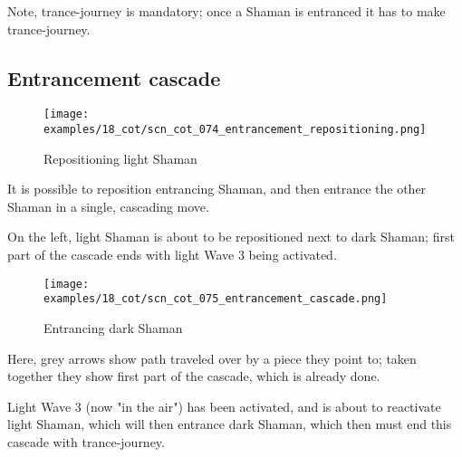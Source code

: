 Note, trance-journey is mandatory; once a Shaman is entranced it has to make
trance-journey.

\clearpage %

\subsection*{Entrancement cascade}
\label{sec:Conquest of Tlalocan/Trance-journey/Entrancement cascade}

\noindent
\begin{wrapfigure}[9]{l}{0.4\textwidth}
\centering
\texttt{[image: examples/18\_cot/scn\_cot\_074\_entrancement\_repositioning.png]}
\vspace*{-0.4\baselineskip}
\caption{Repositioning light Shaman}
\label{fig:scn_cot_074_entrancement_repositioning}
\end{wrapfigure}
It is possible to reposition entrancing Shaman, and then entrance the other Shaman
in a single, cascading move.

On the left, light Shaman is about to be repositioned next to dark Shaman; first
part of the cascade ends with light Wave 3 being activated.

\vspace*{5.3\baselineskip}

\noindent
\begin{wrapfigure}[11]{l}{0.4\textwidth}
\centering
\texttt{[image: examples/18\_cot/scn\_cot\_075\_entrancement\_cascade.png]}
\vspace*{-0.4\baselineskip}
\caption{Entrancing dark Shaman}
\label{fig:scn_cot_075_entrancement_cascade}
\end{wrapfigure}
Here, grey arrows show path traveled over by a piece they point to; taken together
they show first part of the cascade, which is already done.

Light Wave 3 (now "in the air") has been activated, and is about to reactivate
light Shaman, which will then entrance dark Shaman, which then must end this
cascade with trance-journey.

\clearpage %

